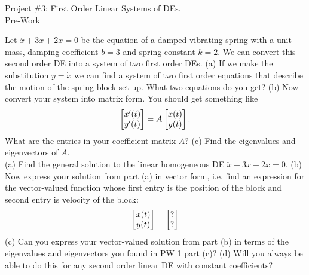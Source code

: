 \documentclass[epsf]{article}
\begin{document}
\newcommand{\R}{\mathbb{R}}
\newcommand{\noi}{\noindent}
\newcommand{\bs}{\bigskip}



\begin{center}
{\Large Project \#3: First Order Linear Systems of DEs.\\
\vskip 2mm
Pre-Work}
\end{center}


\noi{\bf PW 1}  Let $\ddot{x} + 3\dot{x} + 2x = 0$ be the equation of a damped vibrating spring with a unit mass, damping coefficient $b=3$ and spring constant $k=2$.  We can convert this second order DE into a system of two first order DEs.  
\vskip 2mm
\noi (a) If we make the substitution $y=\dot{x}$ we can find a system of two first order equations that describe the motion of the spring-block set-up.  What two equations do you get?  
\vskip 2mm
\noi (b) Now convert your system into matrix form.  You should get something like
$$ \begin{bmatrix}x'(t) \cr y'(t) \end{bmatrix} = A  \begin{bmatrix}x(t) \cr y(t) \end{bmatrix}.$$ What are the entries in your coefficient matrix $A$?
\vskip 2mm
\noi (c) Find the eigenvalues and eigenvectors of $A$.
\\


\noi{\bf PW 2} (a) Find the general solution to the linear homogeneous DE $\ddot{x} + 3\dot{x} + 2x = 0$.
\vskip 2mm
\noi (b) Now express your solution from part (a) in vector form, i.e. find an expression for the vector-valued function whose first entry is the position of the block and second entry is velocity of the block:
$$\begin{bmatrix}x(t) \cr y(t) \end{bmatrix} = \begin{bmatrix} ? \cr ? \end{bmatrix}$$
\vskip 2mm
\noi (c) Can you express your vector-valued solution from part (b) in terms of the eigenvalues and eigenvectors you found in PW 1 part (c)?  
\vskip 2mm
\noi (d) Will you always be able to do this for any second order linear DE with constant coefficients?
\end{document}

